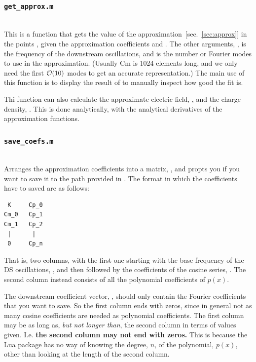 \documentclass[11pt,a4paper, 
swedish, english %
]{article}
\begin{document}
\subsubsection{\texttt{get\_approx.m}}
\indent{}\\
This is a function that gets the value of the
approximation~[sec.~\ref{sec:approx}] in the points , given
the approximation coefficients  and . The other
arguments, , is the frequency of the downstream oscillations,
and  is the number or Fourier modes to use in the
approximation. (Usually Cm is 1024 elements long, and we only need the
first $\order{10}$ modes to get an accurate representation.) 
The main use of this function is to display the result of 
 to manually inspect how good the fit is.

Thi function can also calculate the approximate electric field,
, and the charge density, . This is done
analytically, with the analytical derivatives of the approximation
functions. 


\subsubsection{\texttt{save\_coefs.m}}
\label{sec:save_coefs}
\indent{}\\
Arranges the approximation coefficients into a matrix,
, and propts you if you want to save it to the path
provided in .
The format in which the coefficients have to saved are as follows:
\vspace{-1.5em}
\begin{lstlisting}
 K     Cp_0
Cm_0   Cp_1
Cm_1   Cp_2
 |      |
 0     Cp_n
\end{lstlisting}
That is, two columns, with the first one starting with the base
frequency of the DS oscillations, , and then followed by the
coefficients of the cosine series, . The second column
instead consists of all the polynomial coefficients of $p(x)$.

The downstream coefficient vector, , should only contain the
Fourier coefficients that you want to save. So the first column ends
with zeros, since in general not as many cosine coefficients are
needed as polynomial coefficients. The first column may be as long as,
\emph{but not longer than}, the second column in terms of values
given. I.e. \textbf{the second column may not end with zeros.} This is
because the Lua package has no way of knowing the degree, $n$, of the
polynomial, $p(x)$, other than looking at the length of the second column.
\end{document}
